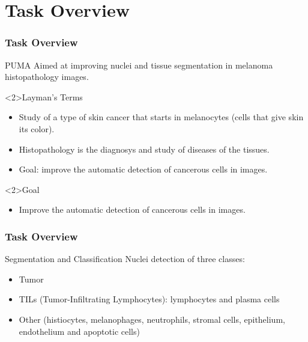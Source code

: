 \documentclass[../main.tex]{subfiles}
\begin{document}
\section{Task Overview}
\begin{frame}[t]
    \frametitle{Task Overview}

    \begin{block}{PUMA}
        Aimed at improving nuclei and tissue segmentation in melanoma histopathology images.
    \end{block}

    \begin{block}<2>{Layman's Terms}
        \begin{itemize}
            \item Study of a type of skin cancer that starts in melanocytes (cells that give skin its color).
            \item Histopathology is the diagnosys and study of diseases of the tissues.
            \item Goal: improve the automatic detection of cancerous cells in images.
        \end{itemize}
    \end{block}

    \begin{block}<2>{Goal}
        \begin{itemize}
            \item Improve the automatic detection of cancerous cells in images.
        \end{itemize}
    \end{block}
\end{frame}

\begin{frame}[t]
    \frametitle{Task Overview}

    \begin{block}{Segmentation and Classification}
        Nuclei detection of three classes:
        \begin{itemize}
            \item Tumor
            \item TILs (Tumor-Infiltrating Lymphocytes): lymphocytes and plasma cells
            \item Other (histiocytes, melanophages, neutrophils, stromal cells, epithelium, endothelium and apoptotic cells)
        \end{itemize}
    \end{block}
\end{frame}
\end{document}
